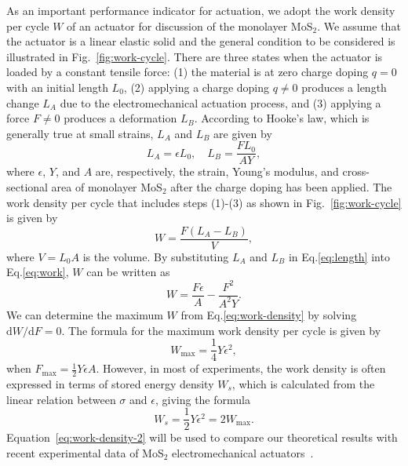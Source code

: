 \documentclass[12pt]{iopart}
\begin{document}
As an important performance indicator for actuation, we adopt the
work density per cycle $W$ of an actuator
for discussion of the monolayer MoS$_2$.  We assume that the actuator is a linear
elastic solid and the general condition to be considered is
illustrated in Fig.~\ref{fig:work-cycle}.  There are three states when
the actuator is loaded by a constant tensile force: (1) the material
is at zero charge doping $q=0$ with an initial length $L_0$, (2)
applying a charge doping $q\neq 0$ produces a length change $L_A$ due
to the electromechanical actuation process, and (3) applying a force
$F\neq 0$ produces a deformation $L_B$. According to Hooke's law,
which is generally true at small strains, $L_A$ and $L_B$ are given by
\begin{equation}
\label{eq:length}
L_A=\epsilon L_0,\hspace{1em} L_B=\frac{FL_0}{AY},
\end{equation}
where $\epsilon$, $Y$, and $A$ are, respectively, the strain, Young's modulus, and
cross-sectional area of monolayer MoS$_2$ after the charge doping has
been applied.  The work density per cycle that includes steps (1)-(3) as
shown in Fig.~\ref{fig:work-cycle} is given by~\cite{spinks2005work}
\begin{equation}
\label{eq:work}
W=\frac{F(L_A-L_B)}{V},
\end{equation}
where $V=L_0A$ is the volume.  By substituting $L_A$ and $L_B$ in
Eq.\ref{eq:length} into Eq.\ref{eq:work}, $W$ can be written as
\begin{equation}
\label{eq:work-density}
W=\frac{F\epsilon}{A}-\frac{F^2}{A^2Y}.
\end{equation}
We can determine the maximum $W$ from Eq.\ref{eq:work-density} by
solving $\mathrm{d}W/\mathrm{d}F=0$.  The formula for the
maximum work density per cycle is given by
\begin{equation}
\label{eq:work-density-1}
W_{\mathrm{max}}=\frac{1}{4}Y\epsilon^2,
\end{equation}
when $F_{\mathrm{max}}=\frac{1}{2}Y\epsilon A$. However, in most of
experiments, the work density is often expressed in terms of stored
energy density $W_s$, which is calculated from the linear relation between
$\sigma$ and $\epsilon$, giving the formula
\begin{equation}
\label{eq:work-density-2}
  W_s =\frac{1}{2}Y\epsilon^2 = 2 W_{\mathrm{max}}.
\end{equation}
Equation~\ref{eq:work-density-2} will be used to compare our
theoretical results with recent experimental data of MoS$_2$
electromechanical actuators~\cite{acerce2017metallic}.
\end{document}
